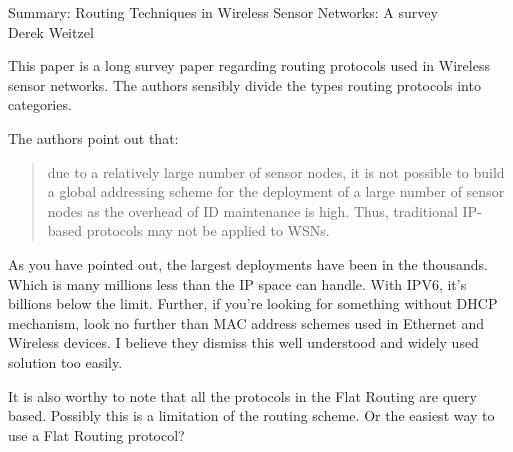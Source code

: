 \documentclass[12pt]{article}
\begin{document}
\begin{center}
{\huge Summary: Routing Techniques in Wireless Sensor Networks: A survey } \\
Derek Weitzel
\end{center}

This paper is a long survey paper regarding routing protocols used in Wireless sensor networks.  The authors sensibly divide the types routing protocols into categories.  

The authors point out that: 
\begin{quote}
due to a relatively large number of sensor nodes, it is not possible to build a global addressing scheme for the deployment of a large number of sensor nodes as the overhead of ID maintenance is high.  Thus, traditional IP-based protocols may not be applied to WSNs.  
\end{quote}
As you have pointed out, the largest deployments have been in the thousands.  Which is many millions less than the IP space can handle.  With IPV6, it's billions below the limit.   Further, if you're looking for something without DHCP mechanism, look no further than MAC address schemes used in Ethernet and Wireless devices.  I believe they dismiss this well understood and widely used solution too easily.

It is also worthy to note that all the protocols in the Flat Routing are query based.  Possibly this is a limitation of the routing scheme.  Or the easiest way to use a Flat Routing protocol?
\end{document}
